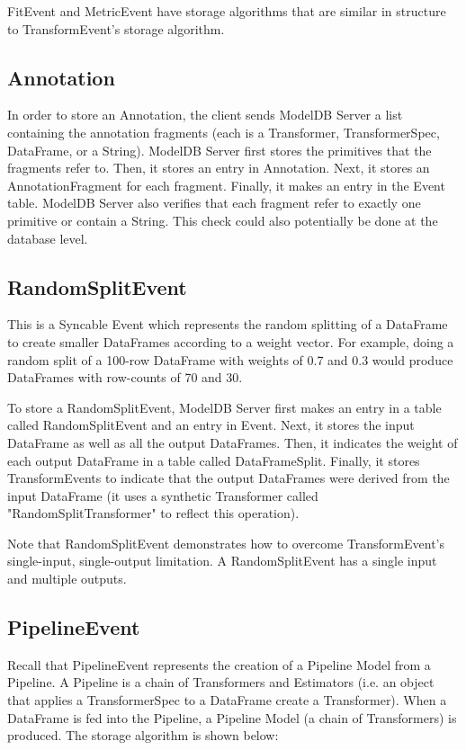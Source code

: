 FitEvent and MetricEvent have storage algorithms that are similar in structure to TransformEvent's
storage algorithm.

\subsection{Annotation}
In order to store an Annotation, the client sends ModelDB Server a list containing 
the annotation fragments (each is a Transformer, TransformerSpec, DataFrame, or a String).
ModelDB Server first stores the primitives that the fragments refer to. Then, it stores
an entry in Annotation. Next, it stores an AnnotationFragment for each fragment. Finally,
it makes an entry in the Event table. ModelDB Server also verifies that each fragment refer
to exactly one primitive or contain a String. This check could also potentially be done at the database level.

\subsection{RandomSplitEvent}
This is a Syncable Event which represents the random splitting of a DataFrame
to create smaller DataFrames according to a weight vector. For example, doing
a random split of a 100-row DataFrame with weights of 0.7 and 0.3 would produce
DataFrames with row-counts of 70 and 30.

To store a RandomSplitEvent, ModelDB Server first makes an entry in a table
called RandomSplitEvent and an entry in Event. Next, it stores the input DataFrame
as well as all the output DataFrames. Then, it indicates the weight of each output
DataFrame in a table called DataFrameSplit. Finally, it stores TransformEvents to
indicate that the output DataFrames were derived from the input DataFrame (it uses
a synthetic Transformer called "RandomSplitTransformer" to reflect this operation).

Note that RandomSplitEvent demonstrates how to overcome TransformEvent's single-input,
single-output limitation. A RandomSplitEvent has a single input and multiple outputs.

\subsection{PipelineEvent}
Recall that PipelineEvent represents the creation of a Pipeline Model from a Pipeline.
A Pipeline is a chain of Transformers and Estimators (i.e. an object that applies a TransformerSpec
to a DataFrame create a Transformer). When a DataFrame is fed into the Pipeline, a Pipeline Model (a
chain of Transformers) is produced.  The storage algorithm is shown below:

